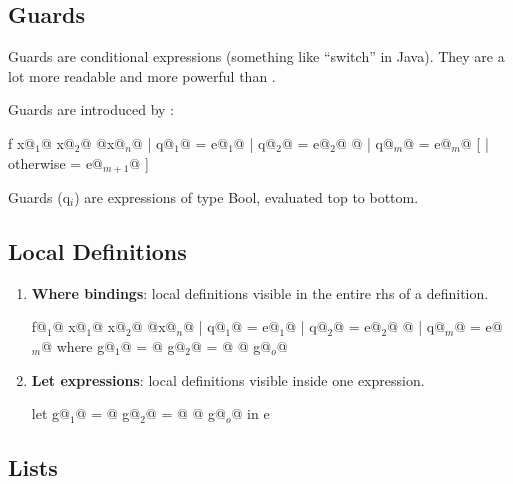 \subsection{Guards}

Guards are conditional expressions (something like ``switch'' in Java).
They are a lot more readable and more powerful than .

Guards are introduced by \codeline{|}:\\
\begin{Haskell}
f x@$_1$@ x@$_2$@ @\dots@ x@$_n$@
  | q@$_1$@     = e@$_1$@
  | q@$_2$@     = e@$_2$@
  @\dots@
  | q@$_m$@     = e@$_m$@
[ | otherwise   = e@$_{m+1}$@ ]
\end{Haskell}

Guards (q$_i$) are expressions of type Bool, evaluated top to bottom.


\subsection{Local Definitions}

\begin{enumerate}
  \item \textbf{Where bindings}: local definitions visible in the entire rhs of a definition.\\
  \begin{Haskell}
f@$_1$@ x@$_1$@ x@$_2$@ @\dots@ x@$_n$@ | q@$_1$@ = e@$_1$@
                    | q@$_2$@ = e@$_2$@ 
                    @\dots@
                    | q@$_m$@ = e@$_m$@ 
	where 
		g@$_1$@ = @\dots@
		g@$_2$@ = @\dots@
		@\dots@
		g@$_o$@
  \end{Haskell}


  \item \textbf{Let expressions}: local definitions visible inside one expression.\\
  \begin{Haskell}
let g@$_1$@ = @\dots@
    g@$_2$@ = @\dots@
    @\dots@
    g@$_o$@
in e
  \end{Haskell}
\end{enumerate}

\subsection{Lists}

